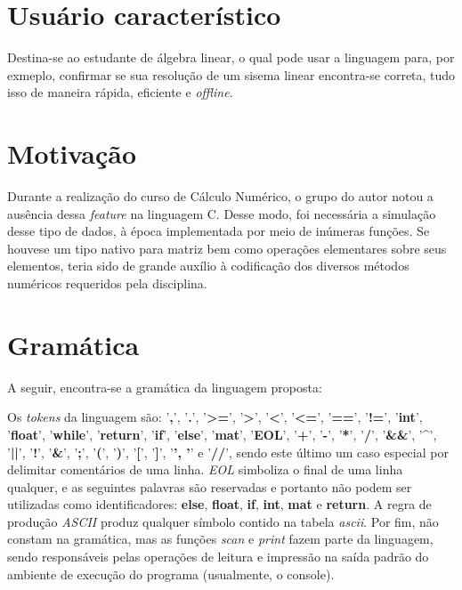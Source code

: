 \documentclass[
	article,			%
	11pt,				%
	oneside,			%
	a4paper,			%
	english,			%
	brazil,				%
	sumario=tradicional
	]{abntex2}
\renewcommand{\it}[1]{\textit{#1}}
\renewcommand{\bf}[1]{\textbf{#1}}
\begin{document}
\section{Usuário característico}
Destina-se ao estudante de álgebra linear, o qual pode usar a linguagem para, por exmeplo, confirmar se sua resolução de um sisema linear encontra-se correta, tudo isso de maneira rápida, eficiente e \it{offline}.

\section{Motivação}
Durante a realização do curso de Cálculo Numérico, o grupo do autor notou a ausência dessa \it{feature} na linguagem C. Desse modo, foi necessária a simulação desse tipo de dados, à época implementada por meio de inúmeras funções. Se houvese um tipo nativo para matriz bem como operações elementares sobre seus elementos, teria sido de grande auxílio à codificação dos diversos métodos numéricos requeridos pela disciplina.
\par



\section{Gramática}
A seguir, encontra-se a gramática da linguagem proposta:
	
Os \textit{tokens} da linguagem são: '\bf{,}', '\bf{.}', '\bf{>=}', '\bf{>}', '\bf{<}', '\bf{<=}', '\bf{==}', '\bf{!=}', '\bf{int}', '\bf{float}', '\bf{while}', '\bf{return}', '\bf{if}', '\bf{else}', '\bf{mat}', '\bf{EOL}', '\bf{+}', '\bf{-}', '\bf{*}', '\bf{/}', '\bf{\&\&}', '\bf{\^}', '\bf{||}', '\bf{!}', '\bf{\&}', '\bf{;}', '\bf{(}', '\bf{)}', '\bf{[}', '\bf{]}', '\bf{{}', '\bf{}}' e '\bf{//}',  sendo este último um caso especial por delimitar comentários de uma linha. \it{EOL} simboliza o final de uma linha qualquer, e as seguintes palavras são reservadas e portanto não podem ser utilizadas como identificadores: \bf{else}, \bf{float}, \bf{if}, \bf{int}, \bf{mat} e \bf{return}. A regra de produção \it{ASCII} produz qualquer símbolo contido na tabela \it{ascii}. Por fim, não constam na gramática, mas as funções  \it{scan} e \it{print} fazem parte da linguagem, sendo responsáveis pelas operações de leitura e impressão na saída padrão do ambiente de execução do programa (usualmente, o console).
\end{document}
